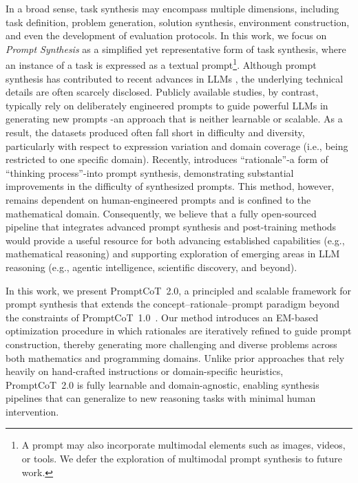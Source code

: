   In a broad sense, task synthesis may encompass multiple dimensions, including task definition, problem generation, solution synthesis, environment construction, and even the development of evaluation protocols. In this work, we focus on \textit{Prompt Synthesis} as a simplified yet representative form of task synthesis, where an instance of a task is expressed as a textual prompt\footnote{A prompt may also incorporate multimodal elements such as images, videos, or tools. We defer the exploration of multimodal prompt synthesis to future work.}. Although prompt synthesis has contributed to recent advances in LLMs \citep{yang2025qwen3,zeng2025glm,moonshot2025kimik2,adler2024nemotron}, the underlying technical details are often scarcely disclosed. Publicly available studies, by contrast, typically rely on deliberately engineered prompts to guide powerful LLMs in generating new prompts \citep{wang2023self,xu2024wizardlm,huang2025key,tang2024mathscale,yue2024mammoth2,li2024numinamath,luo2023wizardcoder,wei2023magicoder,huang2024opencoder,xu2025kodcode,liu2025webexplorer,yang2025swe} -an approach that is neither learnable or scalable. As a result, the datasets produced often fall short in difficulty \citep{zhao2025promptcot} and diversity, particularly with respect to expression variation \citep{xu2024wizardlm} and domain coverage (i.e., being restricted to one specific domain). Recently, \citet{zhao2025promptcot} introduces ``rationale''-a form of ``thinking process''-into prompt synthesis, demonstrating substantial improvements in the difficulty of synthesized prompts. This method, however, remains dependent on human-engineered prompts and is confined to the mathematical domain. Consequently, we believe that a fully open-sourced pipeline that integrates advanced prompt synthesis and post-training methods would provide a useful resource for both advancing established capabilities (e.g., mathematical reasoning) and supporting exploration of emerging areas in LLM reasoning (e.g., agentic intelligence, scientific discovery, and beyond).
  
  
  In this work, we present PromptCoT~2.0, a principled and scalable framework for prompt synthesis that extends the concept–rationale–prompt paradigm beyond the constraints of PromptCoT~1.0~\citep{zhao2025promptcot}.  
  Our method introduces an EM-based optimization procedure in which rationales are iteratively refined to guide prompt construction, thereby generating more challenging and diverse problems across both mathematics and programming domains.  
  Unlike prior approaches that rely heavily on hand-crafted instructions or domain-specific heuristics, PromptCoT~2.0 is fully learnable and domain-agnostic, enabling synthesis pipelines that can generalize to new reasoning tasks with minimal human intervention.  
  
